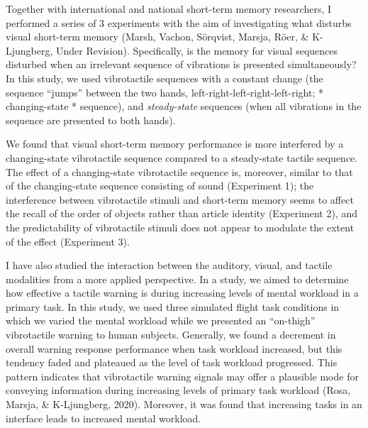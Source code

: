 \documentclass[]{article}
\begin{document}
Together with international and national short-term memory researchers,
I performed a series of 3 experiments with the aim of investigating what
disturbs visual short-term memory (Marsh, Vachon, Sörqvist, Marsja,
Röer, \& K-Ljungberg, Under Revision). Specifically, is the memory for
visual sequences disturbed when an irrelevant sequence of vibrations is
presented simultaneously? In this study, we used vibrotactile sequences
with a constant change (the sequence ``jumps'' between the two hands,
left-right-left-right-left-right; * changing-state * sequence), and
\emph{steady-state} sequences (when all vibrations in the sequence are
presented to both hands).

We found that visual short-term memory performance is more interfered by
a changing-state vibrotactile sequence compared to a steady-state
tactile sequence. The effect of a changing-state vibrotactile sequence
is, moreover, similar to that of the changing-state sequence consisting
of sound (Experiment 1); the interference between vibrotactile stimuli
and short-term memory seems to affect the recall of the order of objects
rather than article identity (Experiment 2), and the predictability of
vibrotactile stimuli does not appear to modulate the extent of the
effect (Experiment 3).

I have also studied the interaction between the auditory, visual, and
tactile modalities from a more applied perspective. In a study, we aimed
to determine how effective a tactile warning is during increasing levels
of mental workload in a primary task. In this study, we used three
simulated flight task conditions in which we varied the mental workload
while we presented an ``on-thigh'' vibrotactile warning to human
subjects. Generally, we found a decrement in overall warning response
performance when task workload increased, but this tendency faded and
plateaued as the level of task workload progressed. This pattern
indicates that vibrotactile warning signals may offer a plausible mode
for conveying information during increasing levels of primary task
workload (Rosa, Marsja, \& K-Ljungberg, 2020). Moreover, it was found
that increasing tasks in an interface leads to increased mental
workload.
\end{document}
